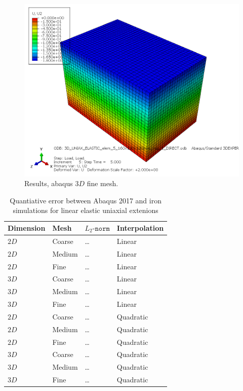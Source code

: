 \begin{figure}[h!]
    \centering 
    \includegraphics[width=\columnwidth]{examples/example-0101/doc/figures/3D_UNIAX_ELASTIC_elem_5_160x120x120mm_intp_1_DIRECTU2.png} 
    \caption{Results, abaqus $3D$ fine mesh.}
    \label{example-0101-abaqus-3D-fig}
\end{figure}
%
\begin{table}[h!]
	\centering
    \begin{tabular}{llll}
    Dimension & Mesh 		& $L_2\texttt{-norm}$			& Interpolation \\ \hline
    $2D$      & Coarse 	& \ldots									& Linear \\
    $2D$      & Medium  & \ldots									& Linear \\
    $2D$      & Fine  	& \ldots									& Linear \\
    $3D$      & Coarse  & \ldots									& Linear \\
    $3D$      & Medium  & \ldots									& Linear \\
		$3D$			&	Fine 		&	\ldots									& Linear \\
    $2D$      & Coarse 	& \ldots									& Quadratic \\
    $2D$      & Medium  & \ldots									& Quadratic \\
    $2D$      & Fine  	& \ldots									& Quadratic \\
    $3D$      & Coarse  & \ldots									& Quadratic \\
    $3D$      & Medium  & \ldots									& Quadratic \\
		$3D$			&	Fine 		&	\ldots									& Quadratic \\		
    \end{tabular}
		\caption{Quantiative error between Abaqus 2017 and iron simulations for linear elastic uniaxial extenions}
		\label{tab:example-0101-valid-Iron-Abaqus}
\end{table}
